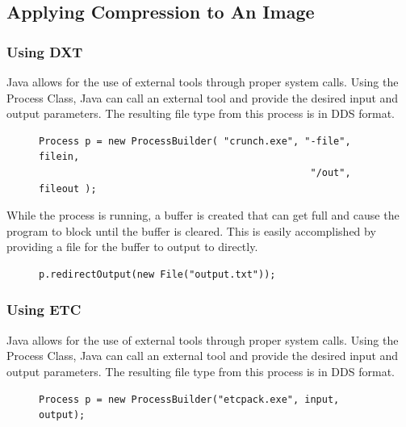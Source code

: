 \documentclass[12pt]{CPP}
\begin{document}
\subsection{Applying Compression to An Image}
\subsubsection{Using DXT}
Java allows for the use of external tools through proper system calls. Using the Process Class, Java can call an external tool and provide the desired input and output parameters. The resulting file type from this process is in DDS format.

\begin{center}
\begin{figure}[!htbp]
\begin{verbatim}
Process p = new ProcessBuilder( "crunch.exe", "-file", filein,
                                               "/out", fileout );
\end{verbatim}
\end{figure}
\end{center}

While the process is running, a buffer is created that can get full and cause the program to block until the buffer is cleared. This is easily accomplished by providing a file for the buffer to output to directly.

\begin{center}
\begin{figure}[!htbp]
\begin{verbatim}
p.redirectOutput(new File("output.txt"));
\end{verbatim}
\end{figure}
\end{center}

\subsubsection{Using ETC}
Java allows for the use of external tools through proper system calls. Using the Process Class, Java can call an external tool and provide the desired input and output parameters. The resulting file type from this process is in DDS format.

\begin{center}
\begin{figure}[!htbp]
\begin{verbatim}
Process p = new ProcessBuilder("etcpack.exe", input, output);
\end{verbatim}
\end{figure}
\end{center}
\end{document}
